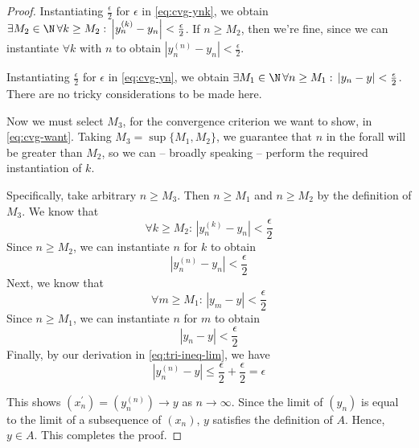 \documentclass[11pt,letterpaper]{article}
\newcommand{\abs}[1]{\left|#1\right|}
\newcommand{\absdiff}[2]{\abs{#1 - #2}}
\newcommand{\convergenceinst}[5]{
  \exists #2 \in \N\,
  \forall #3 \geq #2:\,
  \absdiff{#4}{#5} < #1
}
\begin{document}
\begin{proof}
  Instantiating $\frac{\epsilon}{2}$ for $\epsilon$ in \eqref{eq:cvg-ynk},
  we obtain $\convergenceinst{\frac{\epsilon}{2}}{M_2}{k}{y_n^{(k)}}{y_n}$.
  If $n \geq M_2$, then we're fine, since we can instantiate $\forall k$ with
  $n$ to obtain $\abs{y_n^{(n)} - y_n} < \frac{\epsilon}{2}$.

  Instantiating $\frac{\epsilon}{2}$ for $\epsilon$ in \eqref{eq:cvg-yn},
  we obtain $\convergenceinst{\frac{\epsilon}{2}}{M_1}{n}{y_n}{y}$. There are
  no tricky considerations to be made here.

  Now we must select $M_3$, for the convergence criterion we want to show, in
  \eqref{eq:cvg-want}. Taking $M_3 = \sup\{M_1, M_2\}$, we guarantee that $n$
  in the forall will be greater than $M_2$, so we can -- broadly speaking --
  perform the required instantiation of $k$.

  Specifically, take arbitrary $n \geq M_3$. Then $n \geq M_1$ and
  $n \geq M_2$ by the definition of $M_3$.
  We know that
  \begin{equation*}
    \forall k \geq M_2:\, \absdiff{y_n^{(k)}}{y_n} < \frac{\epsilon}{2}
  \end{equation*}
  Since $n \geq M_2$, we can instantiate $n$ for $k$ to obtain
  \begin{equation*}
    \absdiff{y_n^{(n)}}{y_n} < \frac{\epsilon}{2}
  \end{equation*}
  Next, we know that
  \begin{equation*}
    \forall m \geq M_1:\, \absdiff{y_m}{y} < \frac{\epsilon}{2}
  \end{equation*}
  Since $n \geq M_1$, we can instantiate $n$ for $m$ to obtain
  \begin{equation*}
    \absdiff{y_n}{y} < \frac{\epsilon}{2}
  \end{equation*}
  Finally, by our derivation in \eqref{eq:tri-ineq-lim}, we have
  \begin{equation*}
    \absdiff{y_n^{(n)}}{y}
    \leq \frac{\epsilon}{2} + \frac{\epsilon}{2}
    = \epsilon
  \end{equation*}

  This shows $(x^\prime_n) = (y_n^{(n)}) \to y$ as $n \to \infty$. Since the
  limit of $(y_n)$ is equal to the limit of a subsequence of $(x_n)$, $y$
  satisfies the definition of $A$. Hence, $y \in A$. This completes the proof.
\end{proof}
\end{document}
